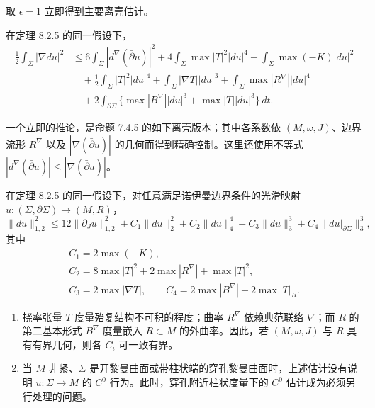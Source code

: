 取 $\epsilon=1$ 立即得到主要离壳估计。
\begin{theorem}\label{thm:ch8-main-global-off-shell-estimate}
在定理 8.2.5 的同一假设下，
\begin{equation}
\begin{split}
\frac12\int_\Sigma|\nabla du|^2
&\leq6\int_\Sigma|d^\nabla(\bar\partial u)|^2
+4\int_\Sigma\max|T|^2|du|^4
+\int_\Sigma\max(-K)|du|^2\\
&\quad+\frac12\int_\Sigma|T|^2|du|^4
+\int_\Sigma|\nabla T||du|^3
+\int_\Sigma\max|R^\nabla||du|^4\\
&\quad+2\int_{\partial\Sigma}\{\max|B^\nabla||du|^3+\max|T||du|^3\}\,dt.
\end{split}
\label{eq:ch8-main-global-off-shell}
\end{equation}
\end{theorem}

一个立即的推论，是命题 7.4.5 的如下离壳版本；其中各系数依
$(M,\omega,J)$、边界流形 $R^\nabla$ 以及 $|\nabla(\bar\partial u)|$
的几何而得到精确控制。这里还使用不等式
$|d^\nabla(\bar\partial u)|\leq|\nabla(\bar\partial u)|$。
\begin{corollary}\label{cor:ch8-w24-off-shell}
在定理 8.2.5 的同一假设下，对任意满足诺伊曼边界条件的光滑映射
$u:(\Sigma,\partial\Sigma)\to(M,R)$，
\[
 \|du\|_{1,2}^2\leq12\|\bar\partial_Ju\|_{1,2}^2
 +C_1\|du\|_2^2+C_2\|du\|_4^4+C_3\|du\|_3^3
 +C_4\|du|_{\partial\Sigma}\|_3^3,
\]
其中
\[
\begin{gathered}
C_1=2\max(-K),\\
C_2=8\max|T|^2+2\max|R^\nabla|+\max|T|^2,\\
C_3=2\max|\nabla T|,\qquad
C_4=2\max|B^\nabla|+2\max|T|_R.
\end{gathered}
\]
\end{corollary}

\begin{remark}\label{rem:ch8-off-shell-coefficients}
\begin{enumerate}[label=(\arabic*)]
\item 挠率张量 $T$ 度量殆复结构不可积的程度；曲率 $R^\nabla$ 依赖典范联络 $\nabla$；而 $R$ 的第二基本形式 $B^\nabla$ 度量嵌入 $R\subset M$ 的外曲率。因此，若 $(M,\omega,J)$ 与 $R$ 具有有界几何，则各 $C_i$ 可一致有界。
\item 当 $M$ 非紧、$\Sigma$ 是开黎曼曲面或带柱状端的穿孔黎曼曲面时，上述估计没有说明 $u:\Sigma\to M$ 的 $C^0$ 行为。此时，穿孔附近柱状度量下的 $C^0$ 估计成为必须另行处理的问题。
\end{enumerate}
\end{remark}

